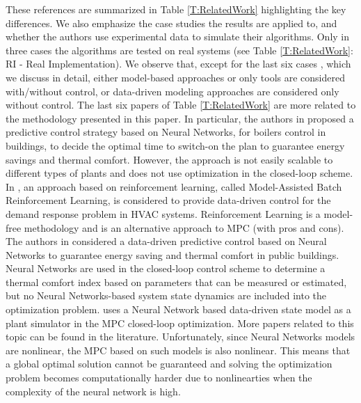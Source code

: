 \textcolor[rgb]{0,0,1}{
These references are summarized in Table \ref{T:RelatedWork} highlighting the key differences.
We also emphasize the case studies the results are applied to, and whether the authors use experimental data to simulate their algorithms.
Only in three cases the algorithms are tested on real systems (see Table \ref{T:RelatedWork}: RI - Real Implementation).
We observe that, except for the last six cases \cite{Macarulla2017,Costanzo2016,Ferreira2012,Afram2017,Behl2016,Jain2017TCPS}, which we discuss in detail, either model-based approaches or only tools are considered with/without control, or data-driven modeling approaches are considered only without control.
The last six papers of Table \ref{T:RelatedWork} are more related to the methodology presented in this paper.
In particular, the authors in \cite{Macarulla2017} proposed a predictive control strategy based on Neural Networks, for boilers control in buildings, to decide the optimal time to switch-on the plan to guarantee energy savings and thermal comfort.
However, the approach is not easily scalable to different types of plants and does not use optimization in the closed-loop scheme.
In \cite{Costanzo2016}, an approach based on reinforcement learning, called Model-Assisted Batch Reinforcement Learning, is considered to provide data-driven control for the demand response problem in HVAC systems.
Reinforcement Learning is a model-free methodology and is an alternative approach to MPC \cite{Ernst2009TSMC} (with pros and cons).
The authors in \cite{Ferreira2012}considered a data-driven predictive control based on Neural Networks to guarantee energy saving and  thermal comfort in public buildings.
Neural Networks are used in the closed-loop control scheme to determine a thermal comfort index based on parameters that can be measured or estimated, but no Neural Networks-based system state dynamics are included into the optimization problem.
\cite{Afram2017} uses a Neural Network based data-driven state model as a plant simulator in the MPC closed-loop optimization.
More papers related to this topic can be found in the literature.
Unfortunately, since Neural Networks models are nonlinear, the MPC based on such models is also nonlinear.
This means that a global optimal solution cannot be guaranteed and solving the optimization problem becomes computationally harder due to nonlinearties when the complexity of the neural network is high.
}
